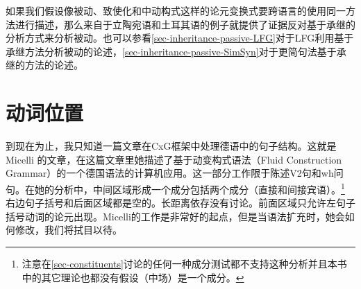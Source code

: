 如果我们假设像被动、致使化和中动构式这样的论元变换式要跨语言的使用同一方法进行描述，那么来自于立陶宛语和土耳其语的例子就提供了证据反对基于承继的分析方式来分析被动\citep{Mueller2006d,Mueller2007d,MWArgSt}。也可以参看\ref{sec-inheritance-passive-LFG}对于LFG利用基于承继方法分析被动的论述，\ref{sec-inheritance-passive-SimSyn}对于更简句法基于承继的方法的论述。

\section{动词位置}

到现在为止，我只知道一篇文章在CxG框架中处理德语中的句子结构。这就是Micelli \citeyearpar{Micelli2012a}的文章，在这篇文章里她描述了基于动变构式语法\indexfcgc（Fluid Construction Grammar）的一个德国语法的计算机应用。这一部分工作限于陈述V2句和wh问句。在她的分析中，中间区域形成一个成分包括两个成分（直接和间接宾语）。\footnote{%
  注意在\ref{sec-constituents}讨论的任何一种成分测试都不支持这种分析并且本书中的其它理论也都没有假设\mf （中场）是一个成分。%
} 右边句子括号和后面区域都是空的。长距离依存没有讨论。前面区域只允许左句子括号动词的论元出现。Micelli的工作是非常好的起点，但是当语法扩充时，她会如何修改，我们将拭目以待。

